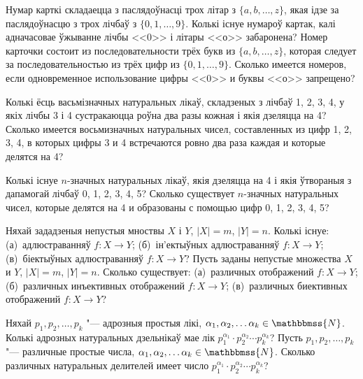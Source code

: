 \documentclass[12pt, a4paper]{article}
\begin{document}
\begin{problemList}
\bigskip

\problemItemSimple
{Нумар карткі складаецца з паслядоўнасці трох літар з  $\{a, b, \dots, z \}$, якая ідзе за паслядоўнасцю з трох лічбаў з $\{0, 1, \dots, 9 \}$. Колькі існуе нумароў картак, калі адначасовае ўжыванне лічбы <<0>> і літары <<о>> забаронена?}
{Номер карточки состоит из последовательности трёх букв из $\{a, b, \dots, z \}$, которая следует за последовательностью из трёх цифр из $\{0, 1, \dots, 9 \}$. Сколько имеется номеров, если одновременное использование цифры <<0>> и буквы <<о>> запрещено?}

\bigskip

\problemItemSimple
{Колькі ёсць васьмізначных натуральных лікаў, складзеных з лічбаў 1, 2, 3, 4, у якіх лічбы 3 і 4 сустракаюцца роўна два разы кожная і якія дзеляцца на 4?}
{Сколько имеется восьмизначных натуральных чисел, составленных из цифр 1, 2, 3, 4, в которых цифры 3 и 4 встречаются ровно два раза каждая и которые делятся на 4?}

\bigskip

\problemItemSimple
{Колькі існуе $n$-значных натуральных лікаў, якія дзеляцца на 4 і якія ўтвораныя з дапамогай лічбаў 0, 1, 2, 3, 4, 5?}
{Сколько существует $n$-значных натуральных чисел, которые делятся на 4 и образованы с помощью цифр 0, 1, 2, 3, 4, 5?}

\bigskip

\problemItemSimple
{Няхай зададзеныя непустыя мноствы $X$ і $Y$, $|X|=m$, $|Y|=n$. Колькі існуе: (а)~адлюстраванняў $f : X \rightarrow Y$; (б)~ін'ектыўных адлюстраванняў $f : X \rightarrow Y$; (в)~біектыўных адлюстраванняў $f : X \rightarrow Y$?}
{Пусть заданы непустые множества $X$ и $Y$, $|X|=m$, $|Y|=n$. Сколько существует: (а)~различных отображений $f : X \rightarrow Y$; (б)~различных инъективных отображений $f : X \rightarrow Y$; (в)~различных биективных отображений $f : X \rightarrow Y$?}

\bigskip

\problemItemSimple
{Няхай $p_{1}, p_{2}, \dots, p_{k}$ "--- адрозныя простыя лікі, $\alpha_{1}, \alpha_{2}, \dots \alpha_{k} \in \mathbbmss{N}$. Колькі адрозных натуральных дзельнікаў мае лік $p_{1} ^{\alpha_{1}} \cdot p_{2} ^{\alpha_{2}} \cdots p_{k} ^{\alpha_{k}}$?}
{Пусть $p_{1}, p_{2}, \dots, p_{k}$ "--- различные простые числа, $\alpha_{1}, \alpha_{2}, \dots \alpha_{k} \in \mathbbmss{N}$. Сколько различных натуральных делителей имеет число $p_{1} ^{\alpha_{1}} \cdot p_{2} ^{\alpha_{2}} \cdots p_{k} ^{\alpha_{k}}$?}

\bigskip


\end{problemList}
\end{document}
